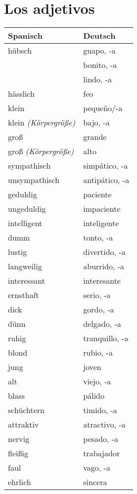 \documentclass{spanish_summary}
\begin{document}
\chapter*{Los adjetivos}

\begin{longtable}{p{} | p{}} 
\textbf{Spanisch}     & \textbf{Deutsch}                                       \\ \hline
\hline
\endhead %
hübsch & guapo, -a\\
& bonito, -a\\
& lindo, -a\\
hässlich & feo\\
klein & peque\~{n}o/-a\\
klein \textit{(Körpergröße)} & bajo, -a\\
groß & grande\\
groß \textit{(Körpergröße)} & alto\\
sympathisch & simpático, -a\\
unsympathisch & antipático, -a\\
geduldig & paciente \\
ungeduldig & impaciente \\
intelligent & inteligente \\
dumm & tonto, -a\\
lustig & divertido, -a\\
langweilig & aburrido, -a\\
interessant & interesante\\
ernsthaft & serio, -a\\
dick & gordo, -a\\
dünn & delgado, -a\\
ruhig & tranquillo, -a\\
blond & rubio, -a\\
jung & joven\\
alt & viejo, -a\\
blass & pálido\\
schüchtern & timido, -a\\
attraktiv & atractivo, -a\\
nervig & pesado, -a\\
fleißig & trabajador\\
faul & vago, -a\\
ehrlich & sincera\\
\end{longtable}
\end{document}
